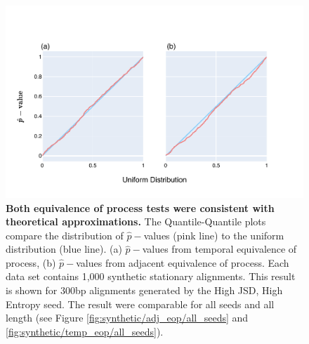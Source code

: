\begin{figure}[htbp]
\centering
\includegraphics[width=\textwidth]{figures/plots/synthetic/adj-temp_eop/High JSD, High Entropy.pdf}
\caption[Both equivalence of process tests were consistent with theoretical approximations]{\textbf{Both equivalence of process tests were consistent with theoretical approximations.} The Quantile-Quantile plots compare the distribution of $\hat p-$values (pink line) to the uniform distribution (blue line). (a) $\hat p-$values from temporal equivalence of process, (b) $\hat p-$values from adjacent equivalence of process. Each data set contains 1,000 synthetic stationary alignments. This result is shown for 300bp alignments generated by the High JSD, High Entropy seed. The result were comparable for all seeds and all length (see Figure \ref{fig:synthetic/adj_eop/all_seeds} and \ref{fig:synthetic/temp_eop/all_seeds}).}
\label{fig:synthetic/adj-temp_eop/HighJSDHighEntropy}
\end{figure}